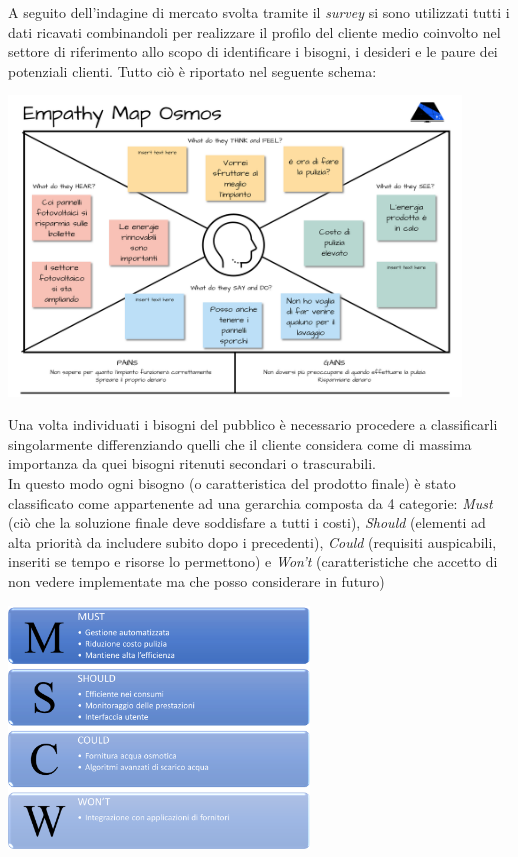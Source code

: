 \documentclass[a4paper, 12pt]{article}
\begin{document}
	A seguito dell'indagine di mercato svolta tramite il \emph{survey} si sono utilizzati tutti i dati ricavati combinandoli per realizzare il profilo del cliente medio coinvolto nel settore di riferimento allo scopo di identificare i bisogni, i desideri e le paure dei potenziali clienti. Tutto ciò è riportato nel seguente schema:
	\begin{center}
		\includegraphics[width=0.9\textwidth]{Images/EmpathyMap.png}
	\end{center}
	Una volta individuati i bisogni del pubblico è necessario procedere a classificarli singolarmente differenziando quelli che il cliente considera come di massima importanza da quei bisogni ritenuti secondari o trascurabili.\\
	In questo modo ogni bisogno (o caratteristica del prodotto finale) è stato classificato come appartenente ad una gerarchia composta da 4 categorie: \emph{Must} (ciò che la soluzione finale deve soddisfare a tutti i costi), \emph{Should} (elementi ad alta priorità da includere subito dopo i precedenti), \emph{Could} (requisiti auspicabili, inseriti se tempo e risorse lo permettono) e \emph{Won't} (caratteristiche che accetto di non vedere implementate ma che posso considerare in futuro)
	\begin{center}
		\includegraphics[width=0.6\textwidth]{Images/MoSCoW.png}
	\end{center}
\end{document}
